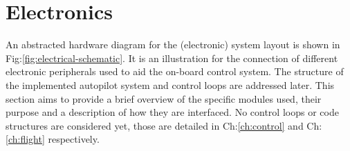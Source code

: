 \section{Electronics}
\label{sec:proto.layout}
{\centering
\vspace{-20pt}
\begin{minipage}{\textwidth}
\centering
{}
\end{minipage}
\vspace{-10pt}
\label{fig:electrical-schematic}
}
\newpage
An abstracted hardware diagram for the (electronic) system layout is shown in Fig:\ref{fig:electrical-schematic}. It is an illustration for the connection of different electronic peripherals used to aid the on-board control system. The structure of the implemented autopilot system and control loops are addressed later. This section aims to provide a brief overview of the specific modules used, their purpose and a description of how they are interfaced. No control loops or code structures are considered yet, those are detailed in Ch:\ref{ch:control} and Ch:\ref{ch:flight} respectively.

